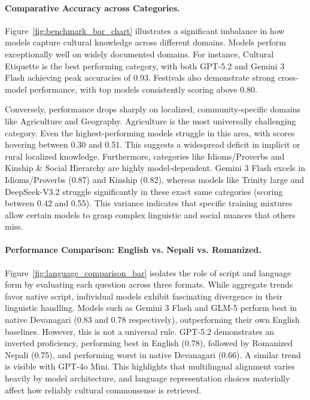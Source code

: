 \documentclass[10pt, a4paper]{article}
\begin{document}
\paragraph{Comparative Accuracy across Categories. }
Figure~\ref{fig:benchmark_bar_chart} illustrates a significant imbalance in how models capture cultural knowledge across different domains. Models perform exceptionally well on widely documented domains. For instance, Cultural Etiquette is the best performing category, with both GPT-5.2 and Gemini 3 Flash achieving peak accuracies of 0.93. Festivals also demonstrate strong cross-model performance, with top models consistently scoring above 0.80.

Conversely, performance drops sharply on localized, community-specific domains like Agriculture and Geography. Agriculture is the most universally challenging category. Even the highest-performing models struggle in this area, with scores hovering between 0.30 and 0.51. This suggests a widespread deficit in implicit or rural localized knowledge. Furthermore, categories like Idioms/Proverbs and Kinship \& Social Hierarchy are highly model-dependent. Gemini 3 Flash excels in Idioms/Proverbs (0.87) and Kinship (0.82), whereas models like Trinity large and DeepSeek-V3.2 struggle significantly in these exact same categories (scoring between 0.42 and 0.55). This variance indicates that specific training mixtures allow certain models to grasp complex linguistic and social nuances that others miss. 

\paragraph{Performance Comparison: English vs. Nepali vs. Romanized. }
Figure~\ref{fig:language_comparison_bar} isolates the role of script and language form by evaluating each question across three formats. While aggregate trends favor native script, individual models exhibit fascinating divergence in their linguistic handling. Models such as Gemini 3 Flash and GLM-5 perform best in native Devanagari (0.83 and 0.78 respectively), outperforming their own English baselines. However, this is not a universal rule. GPT-5.2 demonstrates an inverted proficiency, performing best in English (0.78), followed by Romanized Nepali (0.75), and performing worst in native Devanagari (0.66). A similar trend is visible with GPT-4o Mini. This highlights that multilingual alignment varies heavily by model architecture, and language representation choices materially affect how reliably cultural commonsense is retrieved.
\end{document}
